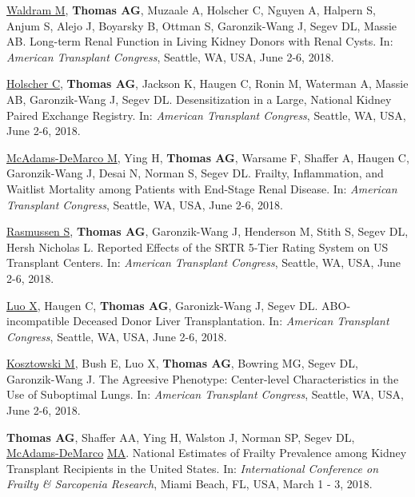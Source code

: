 \documentclass[10pt]{article}
\makeatletter
\newlength{\bibhang}
\newlength{\bibsep}
 {\@listi \global\bibsep\itemsep \global\advance\bibsep by\parsep}
\newenvironment{bibenum*}
  {\renewcommand\labelenumi{[\theenumi]}%
   \etaremune[
     topsep=0pt,
     itemsep=\bibsep,
     parsep=0pt,partopsep=0pt,
     itemindent=-\bibhang,
     leftmargin={\bibhang+\widthof{[999]}}]}
  {\endetaremune}
\makeatother
\begin{document}
\begin{bibenum*}
\item \underline{Waldram M}, \textbf{Thomas AG}, Muzaale A, Holscher C,
  Nguyen A, Halpern S, Anjum S, Alejo J, Boyarsky B, Ottman S,
  Garonzik-Wang J, Segev DL, Massie AB.
  Long-term Renal Function in Living Kidney Donors with Renal Cysts.
  In: \emph{American Transplant Congress},
  Seattle, WA, USA, June 2-6, 2018.

\item \underline{Holscher C}, \textbf{Thomas AG}, Jackson K, Haugen C,
  Ronin M, Waterman A, Massie AB, Garonzik-Wang J, Segev DL.
  Desensitization in a Large, National Kidney Paired Exchange Registry.
  In: \emph{American Transplant Congress},
  Seattle, WA, USA, June 2-6, 2018.

\item \underline{McAdams-DeMarco M}, Ying H, \textbf{Thomas AG},
  Warsame F, Shaffer A, Haugen C, Garonzik-Wang J, Desai N,
  Norman S, Segev DL. Frailty, Inflammation, and Waitlist
  Mortality among Patients with End-Stage Renal Disease.
  In: \emph{American Transplant Congress},
  Seattle, WA, USA, June 2-6, 2018.

\item \underline{Rasmussen S}, \textbf{Thomas AG}, Garonzik-Wang J,
  Henderson M, Stith S, Segev DL, Hersh Nicholas L. Reported Effects
  of the SRTR 5-Tier Rating System on US Transplant Centers.
  In: \emph{American Transplant Congress},
  Seattle, WA, USA, June 2-6, 2018.

\item \underline{Luo X}, Haugen C, \textbf{Thomas AG},
  Garonizk-Wang J, Segev DL.
  ABO-incompatible Deceased Donor Liver Transplantation.
  In: \emph{American Transplant Congress},
  Seattle, WA, USA, June 2-6, 2018.

\item \underline{Kosztowski M}, Bush E, Luo X, \textbf{Thomas AG},
  Bowring MG, Segev DL, Garonzik-Wang J.
  The Agreesive Phenotype: Center-level Characteristics in the Use
  of Suboptimal Lungs.
  In: \emph{American Transplant Congress},
  Seattle, WA, USA, June 2-6, 2018.

\item \textbf{Thomas AG}, Shaffer AA, Ying H, Walston J,
  Norman SP, Segev DL, \underline{McAdams-DeMarco} \underline{MA}.
  National Estimates of Frailty Prevalence among Kidney
  Transplant Recipients in the United States.
  In: \emph{International Conference on Frailty \& Sarcopenia Research},
  Miami Beach, FL, USA, March 1 - 3, 2018.


\end{bibenum*}
\end{document}
